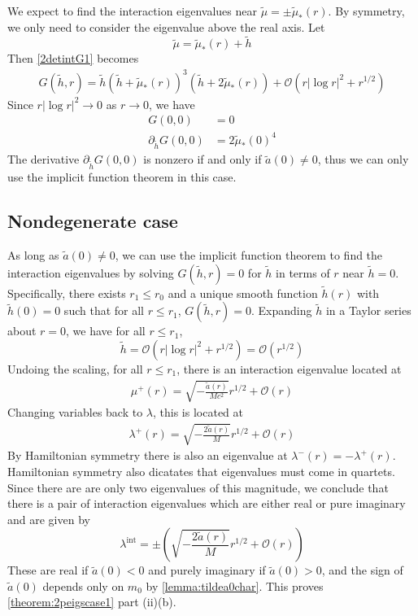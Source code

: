 \documentclass[thesis.tex]{subfiles}
\begin{document}
We expect to find the interaction eigenvalues near $\tilde{\mu} = \pm \tilde{\mu}_*(r)$. By symmetry, we only need to consider the eigenvalue above the real axis. Let
\[
\tilde{\mu} = \tilde{\mu}_*(r) + \tilde{h}
\]
Then \cref{2detintG1} becomes
\begin{equation}\label{2detintG2}
\begin{aligned}
G(\tilde{h},r) = \tilde{h} ( \tilde{h} + \tilde{\mu}_*(r))^3 (\tilde{h} + 2 \tilde{\mu}_*(r)) + \mathcal{O}\left( r |\log r|^2 + r^{1/2} \right)
\end{aligned}
\end{equation}
Since $r |\log r|^2  \rightarrow 0$ as $r \rightarrow 0$, we have
\begin{align*}
G(0, 0) &= 0 \\
\partial_{\tilde{h}} G(0, 0) &= 2 \tilde{\mu}_*(0)^4
\end{align*}
The derivative $\partial_{\tilde{h}} G(0, 0)$ is nonzero if and only if $\tilde{a}(0) \neq 0$, thus we can only use the implicit function theorem in this case.

\subsection{Nondegenerate case}

As long as $\tilde{a}(0) \neq 0$, we can use the implicit function theorem to find the interaction eigenvalues by solving $G(\tilde{h},r) = 0$ for $\tilde{h}$ in terms of $r$ near $\tilde{h} = 0$. Specifically, there exists $r_1 \leq r_0$ and a unique smooth function $\tilde{h}(r)$ with $\tilde{h}(0) = 0$ such that for all $r \leq r_1$, $G(\tilde{h}, r) = 0$. Expanding $\tilde{h}$ in a Taylor series about $r = 0$, we have for all $r \leq r_1$,
\[
\tilde{h} = \mathcal{O}\left( r |\log r|^2 + r^{1/2} \right) = \mathcal{O}\left( r^{1/2} \right)
\]
Undoing the scaling, for all $r \leq r_1$, there is an interaction eigenvalue located at
\begin{align*}
\mu^+(r) = \sqrt{-\frac{\tilde{a}(r)}{M c^2}}r^{1/2} + \mathcal{O}\left( r \right)
\end{align*}
Changing variables back to $\lambda$, this is located at
\begin{align*}
\lambda^+(r) = \sqrt{-\frac{2 \tilde{a}(r)}{M}}r^{1/2} + \mathcal{O}\left( r \right)
\end{align*}
By Hamiltonian symmetry there is also an eigenvalue at $\lambda^-(r) = -\lambda^+(r)$. Hamiltonian symmetry also dicatates that eigenvalues must come in quartets. Since there are are only two eigenvalues of this magnitude, we conclude that there is a pair of interaction eigenvalues which are either real or pure imaginary and are given by
\[
\lambda^{\text{int}} = \pm \left( \sqrt{-\frac{2 \tilde{a}(r)}{M}}r^{1/2} + \mathcal{O}\left( r \right) \right)
\]
These are real if $\tilde{a}(0) < 0$ and purely imaginary if $\tilde{a}(0) > 0$, and the sign of $\tilde{a}(0)$ depends only on $m_0$ by \cref{lemma:tildea0char}. This proves \cref{theorem:2peigscase1} part (ii)(b).
\end{document}
